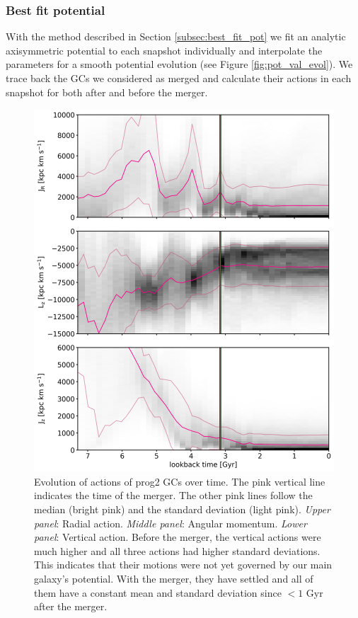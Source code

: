 \subsubsection{Best fit potential}\label{subsubsec:GCs_action_time_right_pot}
With the method described in Section \ref{subsec:best_fit_pot} we fit an analytic axisymmetric potential to each snapshot individually and interpolate the parameters for a smooth potential evolution (see Figure \ref{fig:pot_val_evol}). We trace back the \acp{GC} we considered as merged and calculate their actions in each snapshot for both after and before the merger. 
\begin{figure}[htbp]
\captionsetup{format=plain}
    \centering
	\includegraphics[width=\textwidth]{plots/Dynamics/prog2/action_time_evolution_wodisk_hist_mean.png}

	\caption{Evolution of actions of prog2 \acp{GC} over time. The pink vertical line indicates the time of the merger. The other pink lines follow the median (bright pink) and the standard deviation (light pink). \textit{Upper panel}: Radial action. \textit{Middle panel}: Angular momentum. \textit{Lower panel}: Vertical action. Before the merger, the vertical actions were much higher and all three actions had higher standard deviations. This indicates that their motions were not yet governed by our main galaxy's potential. With the merger, they have settled and all of them have a constant mean and standard deviation since $<1$ Gyr after the merger.}\label{fig:actions_time_evolution_prog2}
\end{figure}

